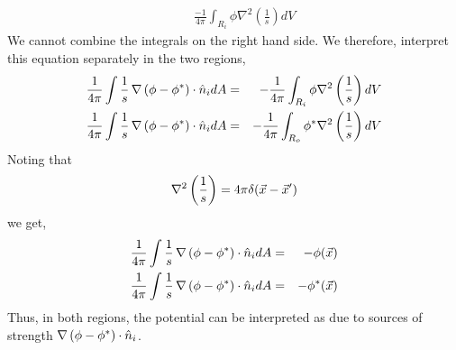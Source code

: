 \begin{enumerate}
\begin{itemize}
\begin{eqnarray*}
 & & \frac{-1}{4\pi}\int_{R_i}\phi\nabla^2\left(\frac{1}{s}\right)dV
\end{eqnarray*}
We cannot combine the integrals on the right hand side. We therefore, interpret this equation separately in the two regions,
\begin{eqnarray*}
\frac{1}{4\pi}\int \frac{1}{s}\operatorname{\nabla}\left(\phi - \phi^\ast\right)\cdot\hat{n}_i dA &=& -\frac{1}{4\pi}\int_{R_i}\phi\nabla^2\left(\frac{1}{s}\right)dV \\
\frac{1}{4\pi}\int \frac{1}{s}\operatorname{\nabla}\left(\phi - \phi^\ast\right)\cdot\hat{n}_i dA &=& -\frac{1}{4\pi}\int_{R_o}\phi^\ast\nabla^2\left(\frac{1}{s}\right)dV
\end{eqnarray*}
Noting that 
\[
\nabla^2\left(\frac{1}{s}\right) = 4\pi\delta(\vec{x} - \vec{x}^\prime)
\]
we get,
\begin{eqnarray*}
\frac{1}{4\pi}\int \frac{1}{s}\operatorname{\nabla}\left(\phi - \phi^\ast\right)\cdot\hat{n}_i dA &=& -\phi(\vec{x}) \\
\frac{1}{4\pi}\int \frac{1}{s}\operatorname{\nabla}\left(\phi - \phi^\ast\right)\cdot\hat{n}_i dA &=& -\phi^\ast(\vec{x})
\end{eqnarray*}
Thus, in both regions, the potential can be interpreted as due to sources of strength $\operatorname{\nabla}\left(\phi - \phi^\ast\right)\cdot\hat{n}_i$.


\end{itemize}
\end{enumerate}
